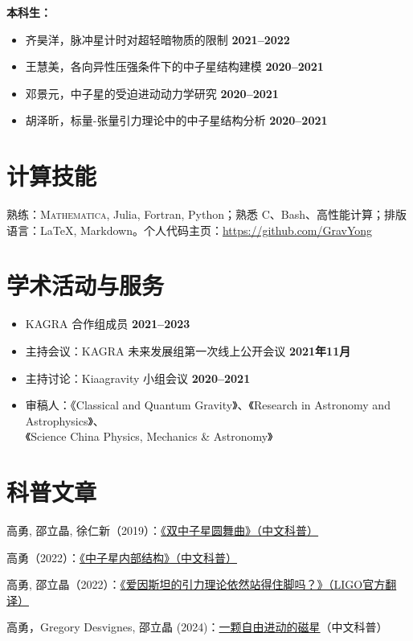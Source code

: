 \documentclass[margin,line]{res_mod}
\begin{document}
\begin{resume}

\textbf{本科生：}
\begin{itemize}
  \item 齐昊洋，脉冲星计时对超轻暗物质的限制 \hfill \textbf{2021–2022}
  \item 王慧美，各向异性压强条件下的中子星结构建模 \hfill \textbf{2020–2021}
  \item 邓景元，中子星的受迫进动动力学研究 \hfill \textbf{2020–2021}
  \item 胡泽昕，标量-张量引力理论中的中子星结构分析 \hfill \textbf{2020–2021}
\end{itemize}


\section{计算技能}
熟练：\textsc{Mathematica}, Julia, Fortran, Python；熟悉 C、Bash、高性能计算；排版语言：\LaTeX, Markdown。个人代码主页：\url{https://github.com/GravYong}

\section{学术活动与服务}
\begin{itemize}
  \item KAGRA 合作组成员 \hfill \textbf{2021–2023}
  \item 主持会议：KAGRA 未来发展组第一次线上公开会议 \hfill \textbf{2021年11月}
  \item 主持讨论：Kiaagravity 小组会议 \hfill \textbf{2020–2021}
  \item 审稿人：《Classical and Quantum Gravity》、《Research in Astronomy and Astrophysics》、\\
  \phantom{审稿人：}《Science China Physics, Mechanics \& Astronomy》
\end{itemize}


\ifx\nopubs\undefined

\else
%
\fi

\section{科普文章}
\begin{etaremune}
\item 高勇, 邵立晶, 徐仁新（2019）：\href{https://gravyong.github.io/files/BNS_Popular.pdf}{《双中子星圆舞曲》（中文科普）}
\item 高勇（2022）：\href{https://gravyong.github.io/files/NS_Structure_Popular.pdf}{《中子星内部结构》（中文科普）}
\item 高勇, 邵立晶（2022）：\href{https://www.ligo.org/science/Publication-O3bTGR/translations/science-summary-chinese-simplified.pdf}{《爱因斯坦的引力理论依然站得住脚吗？》（LIGO官方翻译）}
\item 高勇，Gregory Desvignes, 邵立晶 (2024)：\href{https://pure.mpg.de/rest/items/item_3612895_2/component/file_3612896/content}{一颗自由进动的磁星}（中文科普）
\end{etaremune}


\end{resume}
\end{document}

